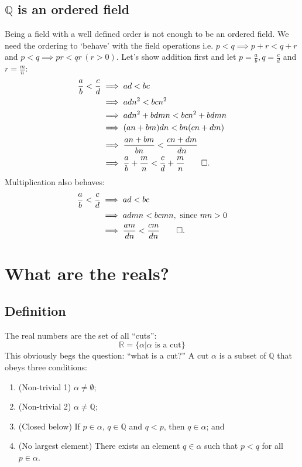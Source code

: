 \documentclass[]{scrartcl}
\theoremstyle{definition}
\newcommand{\bb}[1]{\mathbb{#1}}
\newcommand{\Q}{\bb{Q}}
\newcommand{\R}{\bb{R}}
\begin{document}
\subsection{$\Q$ is an ordered field}
Being a field with a well defined order is not enough to be an ordered field. We need the ordering to `behave' with the field operations i.e. $p<q \implies p+r<q+r$ and $p<q \implies pr<qr\, (r>0)$. Let's show addition first and let $p=\frac{a}{b}, q=\frac{c}{d}$ and $r=\frac{m}{n}$:
\begin{align*}
\frac{a}{b} < \frac{c}{d} &\implies ad < bc \\
&\implies adn^2 < bcn^2 \\
&\implies adn^2 + bdmn < bcn^2 + bdmn \\
&\implies (an+bm)dn < bn(cn+dm) \\
&\implies \frac{an+bm}{bn} < \frac{cn+dm}{dn} \\
&\implies\frac{a}{b} + \frac{m}{n} < \frac{c}{d}+ \frac{m}{n} \qed.
\end{align*}
Multiplication also behaves:
\begin{align*}
\frac{a}{b} < \frac{c}{d} &\implies ad < bc \\
&\implies admn < bcmn, \text{ since }mn>0 \\
&\implies \frac{am}{dn} < \frac{cm}{dn} \qed.
\end{align*}

\section{What are the reals?}
\subsection{Definition}
The real numbers are the set of all ``cuts'':
$$
\R = \{\alpha | \alpha \text{ is a cut}\}
$$
This obviously begs the question: ``what is a cut?'' A cut $\alpha$ is a subset of $\Q$ that obeys three conditions:
\begin{enumerate}
    \item (Non-trivial 1) $\alpha \neq \emptyset$;
    \item (Non-trivial 2) $\alpha \neq \Q$;
    \item (Closed below) If $p\in \alpha$, $q\in\Q$ and $q<p$, then $q\in\alpha$; and
    \item (No largest element) There exists an element $q\in\alpha$ such that $p<q$ for all $p\in\alpha$.
\end{enumerate}
\end{document}
